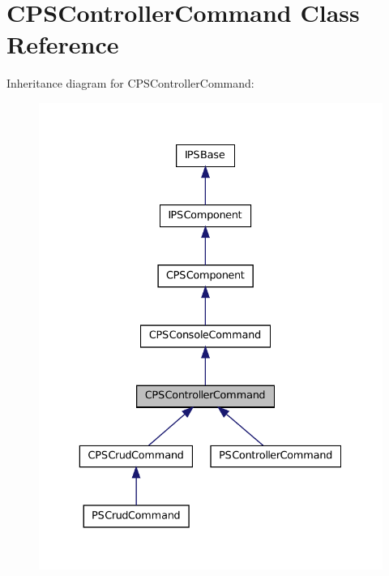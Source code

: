 \hypertarget{classCPSControllerCommand}{
\section{CPSControllerCommand Class Reference}
\label{classCPSControllerCommand}
}


Inheritance diagram for CPSControllerCommand:\nopagebreak
\begin{figure}[H]
\begin{center}
\leavevmode
\includegraphics[width=332pt]{classCPSControllerCommand__inherit__graph}
\end{center}
\end{figure}


